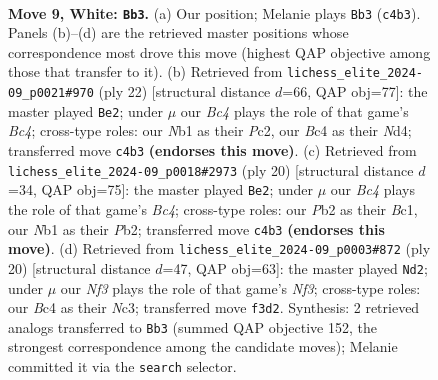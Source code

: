 \documentclass[11pt]{article}
\begin{document}
\clearpage

\begin{figure}[p]\centering
\begin{subfigure}{0.46\textwidth}\centering
\resizebox{\linewidth}{!}{%
\newchessgame
\chessboard[
  setfen={rnbk3r/1p3ppp/p3pn2/2b5/2B5/4PN2/PP3PPP/RNB2RK1 w - - 0 9},
  showmover=false,
  pgfstyle=straightmove, color=movearrow, markmove={c4-b3}
]}
\caption{}
\end{subfigure}\hfill
\begin{subfigure}{0.46\textwidth}\centering
\resizebox{\linewidth}{!}{%
\newchessgame
\chessboard[
  setfen={r1b1kb1r/1p3ppp/p3pn2/8/2BN4/8/PPP2PPP/R1B2RK1 w kq - 1 12},
  showmover=false,
  pgfstyle=straightmove, color=movearrow, markmove={c4-e2}
]}
\caption{}
\end{subfigure}
\\[4pt]
\begin{subfigure}{0.46\textwidth}\centering
\resizebox{\linewidth}{!}{%
\newchessgame
\chessboard[
  setfen={r1b1k2r/1p3ppp/p1n1pn2/2b5/2B5/2N1PN2/PP3PPP/R1BR2K1 w kq - 0 11},
  showmover=false,
  pgfstyle=straightmove, color=movearrow, markmove={c4-e2}
]}
\caption{}
\end{subfigure}\hfill
\begin{subfigure}{0.46\textwidth}\centering
\resizebox{\linewidth}{!}{%
\newchessgame
\chessboard[
  setfen={rnb4r/4kppp/p3pn2/1pb5/8/2N1PN2/PP2BPPP/R1B2RK1 w - - 0 11},
  showmover=false,
  pgfstyle=straightmove, color=movearrow, markmove={f3-d2}
]}
\caption{}
\end{subfigure}
\caption{\textbf{Move 9, White: \texttt{Bb3}.} (a) Our position; Melanie plays \texttt{Bb3} (\texttt{c4b3}). Panels (b)--(d) are the retrieved master positions whose correspondence most drove this move (highest QAP objective among those that transfer to it). (b) Retrieved from \texttt{lichess\_elite\_2024-09\_p0021\#970} (ply 22) [structural distance $d$=66, QAP obj=77]: the master played \texttt{Be2}; under $\mu$ our \emph{Bc4} plays the role of that game's \emph{Bc4}; cross-type roles: our \emph{N}b1 as their \emph{P}c2, our \emph{B}c4 as their \emph{N}d4; transferred move \texttt{c4b3} \textbf{(endorses this move)}. (c) Retrieved from \texttt{lichess\_elite\_2024-09\_p0018\#2973} (ply 20) [structural distance $d$=34, QAP obj=75]: the master played \texttt{Be2}; under $\mu$ our \emph{Bc4} plays the role of that game's \emph{Bc4}; cross-type roles: our \emph{P}b2 as their \emph{B}c1, our \emph{N}b1 as their \emph{P}b2; transferred move \texttt{c4b3} \textbf{(endorses this move)}. (d) Retrieved from \texttt{lichess\_elite\_2024-09\_p0003\#872} (ply 20) [structural distance $d$=47, QAP obj=63]: the master played \texttt{Nd2}; under $\mu$ our \emph{Nf3} plays the role of that game's \emph{Nf3}; cross-type roles: our \emph{B}c4 as their \emph{N}c3; transferred move \texttt{f3d2}. Synthesis: 2 retrieved analogs transferred to \texttt{Bb3} (summed QAP objective 152, the strongest correspondence among the candidate moves); Melanie committed it via the \texttt{search} selector.}
\label{fig:thought-m16}
\end{figure}
\end{document}
